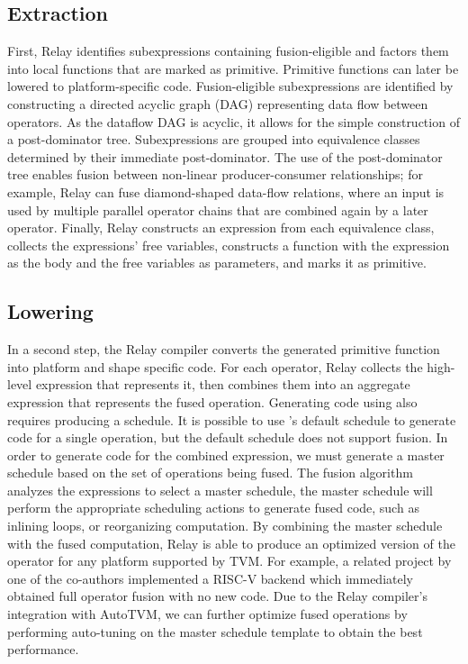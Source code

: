 \subsection*{Extraction}

First, Relay identifies subexpressions containing
  fusion-eligible and factors them into local functions that
  are marked as primitive.
Primitive functions can later be lowered to platform-specific
  code.
Fusion-eligible subexpressions are identified by constructing a
  directed acyclic graph (DAG) representing data flow between operators.
As the dataflow DAG is acyclic, it allows for the simple construction
  of a post-dominator tree.
Subexpressions are grouped into equivalence classes
  determined by their immediate post-dominator.
The use of the post-dominator tree enables fusion
  between non-linear producer-consumer relationships;
  for example, Relay can fuse diamond-shaped data-flow relations,
  where an input is used by multiple parallel operator chains
  that are combined again by a later operator.
Finally, Relay constructs an expression from each equivalence class,
  collects the expressions' free variables,
  constructs a function with the expression as the body and the free variables
  as parameters,
  and marks it as primitive.

\subsection*{Lowering}

In a second step, the Relay compiler converts the generated primitive
  function into platform and shape specific code.
For each operator, Relay collects the high-level \tvm expression that represents it,
  then combines them into an aggregate expression that represents the fused operation.
Generating code using \tvm also requires producing a schedule.
It is possible to use \tvm's default schedule to generate code for a single operation,
  but the default schedule does not support fusion.
In order to generate code for the combined expression, we must generate a
  master schedule based on the set of operations being fused.
The fusion algorithm analyzes the expressions to select a master
  schedule, the master schedule will perform the appropriate scheduling
  actions to generate fused code, such as inlining loops, or reorganizing
  computation.
By combining the master schedule with the fused computation,
  Relay is able to produce an optimized version of the operator
  for any platform supported by TVM.
For example, a related project by one of the co-authors implemented
  a RISC-V backend which immediately obtained full operator fusion
  with no new code.
Due to the Relay compiler's integration with AutoTVM, we can further
  optimize fused operations by performing auto-tuning on the master
  schedule template to obtain the best performance.

